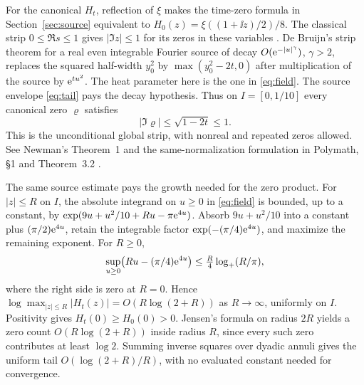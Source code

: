 For the canonical \(H_t\), reflection of \(\xi\) makes the time-zero
formula in Section~\ref{sec:source} equivalent to
\(H_0(z)=\xi((1+\ii z)/2)/8\). The classical strip
\(0\le\Re s\le1\) gives \(|\Im z|\le1\) for its zeros in these
variables \cite[\S25.10(i)]{dlmf}. De Bruijn's strip theorem for a
real even integrable Fourier source of decay
\(O(\mathrm e^{-|u|^\gamma})\), \(\gamma>2\), replaces the squared
half-width \(y_0^2\) by \(\max(y_0^2-2t,0)\) after multiplication
of the source by \(\mathrm e^{tu^2}\). The heat parameter here is the one
in \eqref{eq:field}. The source envelope \eqref{eq:tail} pays the
decay hypothesis. Thus on \(I=[0,1/10]\) every canonical zero
\(\varrho\) satisfies
\begin{equation}
 |\Im\varrho|\le\sqrt{1-2t}\le1 .
 \label{gt-canonical-strip}
\end{equation}
This is the unconditional global strip, with nonreal and repeated
zeros allowed. See Newman's Theorem~1 and the same-normalization
formulation in Polymath, \S1 and Theorem~3.2 \cite{newman,polymath}.

The same source estimate pays the growth needed for the zero product.
For \(|z|\le R\) on \(I\), the absolute integrand on \(u\ge0\) in
\eqref{eq:field} is bounded, up to a constant, by
\(\exp(9u+u^2/10+Ru-\pi\mathrm e^{4u})\). Absorb \(9u+u^2/10\) into a
constant plus \((\pi/2)\mathrm e^{4u}\), retain the integrable factor
\(\exp(-(\pi/4)\mathrm e^{4u})\), and maximize the remaining exponent.
For \(R\ge0\),
\[
 \sup_{u\ge0}\bigl(Ru-(\pi/4)\mathrm e^{4u}\bigr)
 \le \tfrac R4\log_+(R/\pi),
\]
where the right side is zero at \(R=0\). Hence
\(\log\max_{|z|\le R}|H_t(z)|=O(R\log(2+R))\) as \(R\to\infty\),
uniformly on \(I\). Positivity gives \(H_t(0)\ge H_0(0)>0\).
Jensen's formula on radius \(2R\) yields a zero count
\(O(R\log(2+R))\) inside radius \(R\), since every such zero
contributes at least \(\log 2\). Summing inverse squares over
dyadic annuli gives the uniform tail
\(O(\log(2+R)/R)\), with no evaluated constant needed for convergence.

